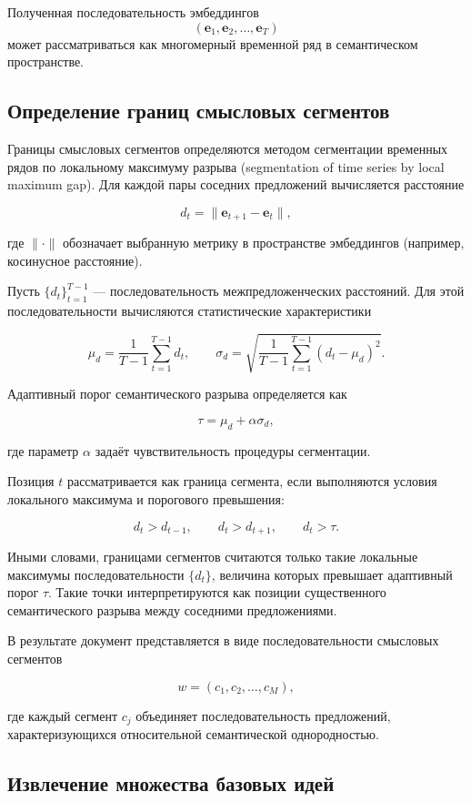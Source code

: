 \documentclass[review,3p,times]{elsarticle}
\begin{document}
Полученная последовательность эмбеддингов
\[
(\mathbf{e}_1,\mathbf{e}_2,\dots,\mathbf{e}_T)
\]
может рассматриваться как многомерный временной ряд в семантическом пространстве.

\subsection{Определение границ смысловых сегментов}

Границы смысловых сегментов определяются методом сегментации временных рядов по локальному максимуму разрыва (segmentation of time series by local maximum gap). Для каждой пары соседних предложений вычисляется расстояние

\[
d_t = \|\mathbf{e}_{t+1}-\mathbf{e}_t\|,
\]

где $\|\cdot\|$ обозначает выбранную метрику в пространстве эмбеддингов (например, косинусное расстояние).

Пусть $\{d_t\}_{t=1}^{T-1}$ — последовательность межпредложенческих расстояний. Для этой последовательности вычисляются статистические характеристики

\[
\mu_d = \frac{1}{T-1}\sum_{t=1}^{T-1} d_t, 
\qquad
\sigma_d = \sqrt{\frac{1}{T-1}\sum_{t=1}^{T-1}(d_t-\mu_d)^2}.
\]

Адаптивный порог семантического разрыва определяется как

\[
\tau = \mu_d + \alpha \sigma_d,
\]

где параметр $\alpha$ задаёт чувствительность процедуры сегментации.

Позиция $t$ рассматривается как граница сегмента, если выполняются условия локального максимума и порогового превышения:

\[
d_t > d_{t-1}, \qquad 
d_t > d_{t+1}, \qquad 
d_t > \tau .
\]

Иными словами, границами сегментов считаются только такие локальные максимумы последовательности $\{d_t\}$, величина которых превышает адаптивный порог $\tau$. Такие точки интерпретируются как позиции существенного семантического разрыва между соседними предложениями.

В результате документ представляется в виде последовательности смысловых сегментов

\[
w=(c_1,c_2,\dots,c_M),
\]

где каждый сегмент $c_j$ объединяет последовательность предложений, характеризующихся относительной семантической однородностью.



\subsection{Извлечение множества базовых идей}
\end{document}
